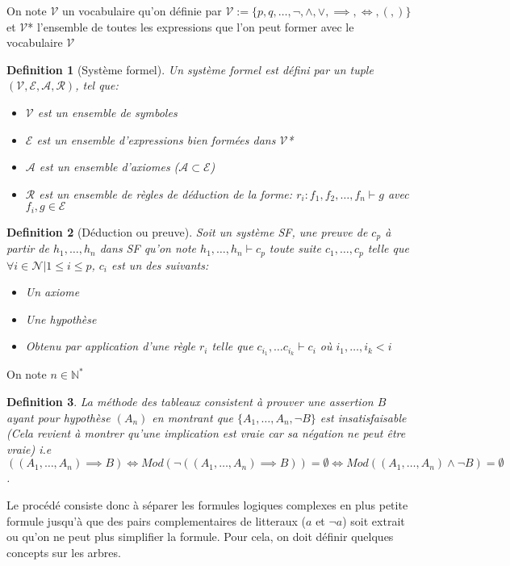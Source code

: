 \documentclass{paper}
\newtheorem{defi}{Definition}
\begin{document}
On note $\mathcal{V}$ un vocabulaire qu'on définie par $\mathcal{V} := \{p, q,\dots, \lnot, \land, \lor, \implies, \Leftrightarrow, (,) \}$ et $\mathcal{V}$* l'ensemble de toutes les expressions que l'on peut former avec le vocabulaire $\mathcal{V}$
\begin{defi}[Système formel]
    Un système formel est défini par un tuple $(\mathcal{V}, \mathcal{E}, \mathcal{A}, \mathcal{R})$, tel que:
    \begin{itemize}
        \item $\mathcal{V}$ est un ensemble de symboles
        \item $\mathcal{E}$ est un ensemble d'expressions bien formées dans $\mathcal{V}$*
        \item $\mathcal{A}$ est un ensemble d'axiomes ($\mathcal{A} \subset \mathcal{E}$)
        \item $\mathcal{R}$ est un ensemble de règles de déduction de la forme: $r_i : f_1, f_2,\dots, f_n \vdash g$ avec $f_i, g \in \mathcal{E}$
    \end{itemize}
\end{defi}

\begin{defi}[Déduction ou preuve]
    Soit un système SF, une preuve de $c_p$ à partir de $h_1,\dots,h_n$ dans SF qu'on note $h_1,\dots, h_n \vdash c_p$
    toute suite $c_1,\dots,c_p$ telle que $\forall i\in\mathcal{N} | 1 \leq i \leq p$, $c_i$ est un des suivants:
    \begin{itemize}
        \item Un axiome
        \item Une hypothèse
        \item Obtenu par application d'une règle $r_i$ telle que $c_{i_1},\dots c_{i_k} \vdash c_i$ où $ i_1,\dots,i_k < i$
    \end{itemize}
\end{defi}

On note $n\in\mathbb{N}^*$
\begin{defi}
    \textit{La méthode des tableaux} consistent à prouver une assertion $B$ ayant pour hypothèse $(A_n)$ en montrant
    que $\{A_1,\dots,A_n, \lnot B\}$ est insatisfaisable (Cela revient à montrer qu'une implication est vraie car sa négation ne peut être vraie)
    i.e $((A_1,\dots,A_n)\implies B) \Leftrightarrow Mod(\lnot((A_1,\dots,A_n)\implies B)) = \emptyset \Leftrightarrow Mod((A_1,\dots,A_n)\land \lnot B) = \emptyset$.
\end{defi}

Le procédé consiste donc à séparer les formules logiques complexes en plus petite formule jusqu'à que des pairs complementaires de litteraux ($a$ et $\lnot a$) soit extrait ou qu'on ne peut plus simplifier la formule.
Pour cela, on doit définir quelques concepts sur les arbres.
\end{document}
